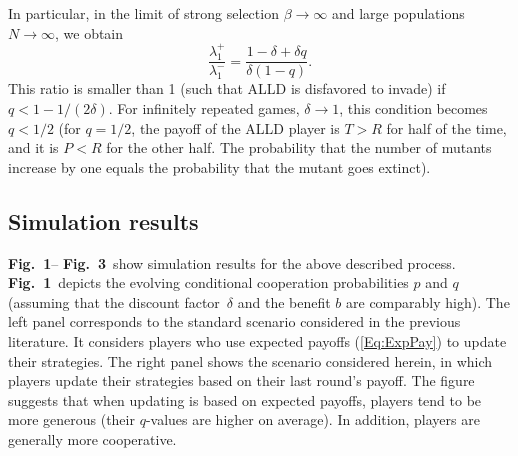 \documentclass[11pt]{article}
\newcommand{\FigEvoProc}{{\bf Fig.~1}}
\newcommand{\FigResultsOverPara}{{\bf Fig.~3}}
\theoremstyle{plainCl1}
\theoremstyle{plainCl2}
\begin{document}
\noindent
In particular, in the limit of strong selection $\beta \rightarrow \infty$ and large populations $N\!\rightarrow \infty$, we obtain
\begin{equation}
\frac{\lambda_1^+}{\lambda_1^-}=
\frac{ 1\!-\!\delta+\delta q}{\delta (1-q)}.
\end{equation}
This ratio is smaller than 1 (such that ALLD is disfavored to invade) if $q<1\!-\!1/(2\delta)$. For infinitely repeated games, $\delta\!\rightarrow\!1$, this condition becomes $q\!<\!1/2$ (for $q\!=\!1/2$, the payoff of the ALLD player is $T\!>\!R$ for half of the time, and it is $P\!<\!R$ for the other half. The probability that the number of mutants increase by one equals the probability that the mutant goes extinct). 


\subsection{Simulation results}

\FigEvoProc -- \FigResultsOverPara~show simulation results for the above described process. \FigEvoProc~depicts the evolving conditional cooperation probabilities $p$ and $q$ (assuming that the discount factor~$\delta$ and the benefit $b$ are comparably high). The left panel corresponds to the standard scenario considered in the previous literature. It considers players who use expected payoffs (\ref{Eq:ExpPay}) to update their strategies. The right panel shows the scenario considered herein, in which players update their strategies based on their last round's payoff. The figure suggests that when updating is based on expected payoffs, players tend to be more generous (their $q$-values are higher on average). In addition, players are generally more cooperative. 
\end{document}
